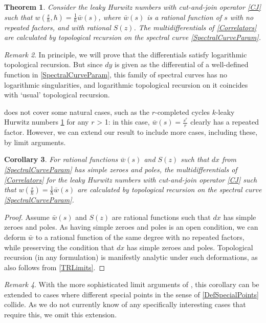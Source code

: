 \documentclass[10pt,a4paper,oneside,no-math,reqno]{amsart}%
\theoremstyle{plain}
\newtheorem{theorem}{Theorem}[section]
\newtheorem{corollary}[theorem]{Corollary}
\theoremstyle{definition}
\theoremstyle{remark}
\newtheorem{remark}[theorem]{Remark}
\numberwithin{equation}{section}
\newcommand{\1}{\mathds{1}}
\newcommand{\<}{\langle}
\renewcommand{\>}{\rangle}
\begin{document}
\begin{theorem}\label{LeakyTRThm}
	Consider the leaky Hurwitz numbers with cut-and-join operator \eqref{CJ} such that $ w(\frac{s}{\hbar},\hbar) = \frac{1}{\hbar} \bar{w}(s) $, where $ \bar{w}(s)$ is a rational function of $s$ with no repeated factors, and with rational $S(z)$. The multidifferentials of \cref{Correlators} are calculated by topological recursion on the spectral curve \eqref{SpectralCurveParam}.
\end{theorem}

\begin{remark}
    In principle, we will prove that the differentials satisfy logarithmic topological recursion. But since $dy$ is given as the differential of a well-defined function in \eqref{SpectralCurveParam}, this family of spectral curves has no logarithmic singularities, and logarithmic topological recursion on it coincides with `usual' topological recursion.
\end{remark}

 does not cover some natural cases, such as the $ r$-completed cycles $ k$-leaky Hurwitz numbers \cref{LeakyTRThm} for any $ r$ > 1: in this case, $ \bar{w} (s) = \frac{s^r}{r}$ clearly has a repeated factor. However, we can extend our result to include more cases, including these, by limit arguments.

\begin{corollary}\label{LeakyTRLimit}
    For rational functions $ \bar{w}(s)$ and $S(z)$ such that $ d x$ from \eqref{SpectralCurveParam} has simple zeroes and poles, the multidifferentials of \cref{Correlators} for the leaky Hurwitz numbers with cut-and-join operator \eqref{CJ} such that $ w(\frac{s}{\hbar}) = \frac{1}{\hbar} \bar{w}(s) $ are calculated by topological recursion on the spectral curve \eqref{SpectralCurveParam}.
\end{corollary}

\begin{proof}
    Assume $ \bar{w}(s)$ and $S(z)$ are rational functions such that $ dx$ has simple zeroes and poles. As having simple zeroes and poles is an open condition, we can deform $ \bar{w}$ to a rational function of the same degree with no repeated factors, while preserving the condition that $ dx $ has simple zeroes and poles. Topological recursion (in any formulation) is manifestly analytic under such deformations, as also follows from \cref{TRLimits}.
\end{proof}

\begin{remark}
    With the more sophisticated limit arguments of \cite{BBCKS25,ABDKS25}, this corollary can be extended to cases where different special points in the sense of \cref{DefSpecialPoints} collide. As we do not currently know of any specifically interesting cases that require this, we omit this extension.
\end{remark}
\end{document}
